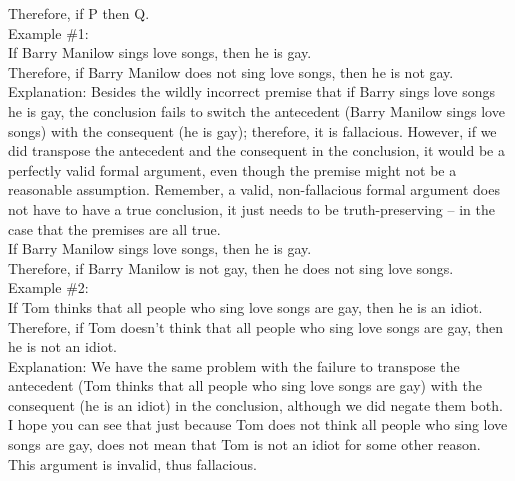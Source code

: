 \documentclass[a4paper,12pt,single,pdftex]{scrartcl}
\begin{document}
    
      Therefore, if P then Q.
    \\

    
      Example \#1:
    \\

    
      If Barry Manilow sings love songs, then he is gay.
    \\

    
      Therefore, if Barry Manilow does not sing love songs, then he is not gay.
    \\

    
      Explanation: Besides the wildly incorrect premise that if Barry sings love songs he is gay, the conclusion fails to switch the antecedent (Barry Manilow sings love songs) with the consequent (he is gay); therefore, it is fallacious.  However, if we did transpose the antecedent and the consequent in the conclusion, it would be a perfectly valid formal argument, even though the premise might not be a reasonable assumption.  Remember, a valid, non-fallacious formal argument does not have to have a true conclusion, it just needs to be truth-preserving -- in the case that the premises are all true.
    \\

    
      If Barry Manilow sings love songs, then he is gay.
    \\

    
      Therefore, if Barry Manilow is not gay, then he does not sing love songs.
    \\

    
      Example \#2:
    \\

    
      If Tom thinks that all people who sing love songs are gay, then he is an idiot.
    \\

    
      Therefore, if Tom doesn’t think that all people who sing love songs are gay, then he is not an idiot.
    \\

    
      Explanation: We have the same problem with the failure to transpose the antecedent (Tom thinks that all people who sing love songs are gay) with the consequent (he is an idiot) in the conclusion, although we did negate them both.  I hope you can see that just because Tom does not think all people who sing love songs are gay, does not mean that Tom is not an idiot for some other reason.  This argument is invalid, thus fallacious.
    \\
\end{document}
